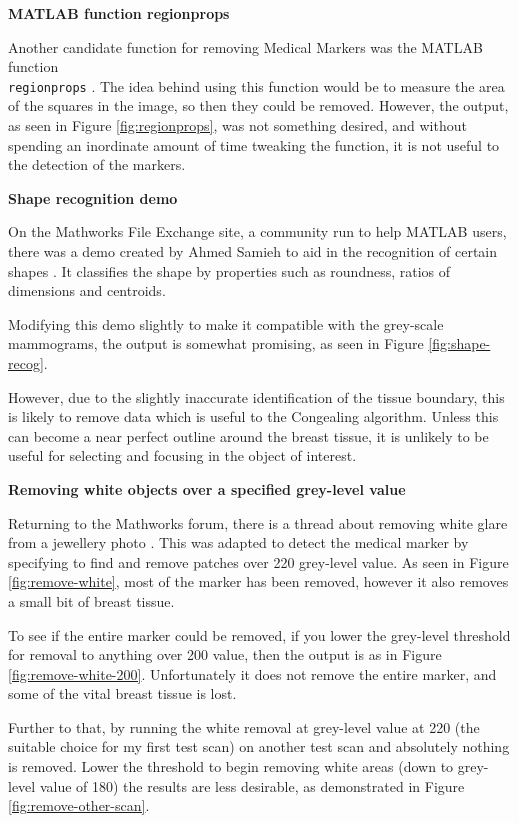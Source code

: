 \noindent \textbf{MATLAB function regionprops}

Another candidate function for removing Medical Markers was the MATLAB function \\ \texttt{regionprops} \cite{regionprops}. The idea behind using this function would be to measure the area of the squares in the image, so then they could be removed. However, the output, as seen in Figure \ref{fig:regionprops}, was not something desired, and without spending an inordinate amount of time tweaking the function, it is not useful to the detection of the markers.

\noindent \textbf{Shape recognition demo}

On the Mathworks File Exchange site, a community run to help MATLAB users, there was a demo created by Ahmed Samieh to aid in the recognition of certain shapes \cite{shape_recognition}. It classifies the shape by properties such as roundness, ratios of dimensions and centroids.

Modifying this demo slightly to make it compatible with the grey-scale mammograms, the output is somewhat promising, as seen in Figure \ref{fig:shape-recog}.

However, due to the slightly inaccurate identification of the tissue boundary, this is likely to remove data which is useful to the \Gls{Congealing} algorithm. Unless this can become a near perfect outline around the breast tissue, it is unlikely to be useful for selecting and focusing in the object of interest.

\noindent  \textbf{Removing white objects over a specified grey-level value}

Returning to the Mathworks forum, there is a thread about removing white glare from a jewellery photo \cite{remove_white}. This was adapted to detect the medical marker by specifying to find and remove patches over 220 grey-level value. As seen in Figure \ref{fig:remove-white}, most of the marker has been removed, however it also removes a small bit of breast tissue.

To see if the entire marker could be removed, if you lower the grey-level threshold for removal to anything over 200 value, then the output is as in Figure \ref{fig:remove-white-200}. Unfortunately it does not remove the entire marker, and some of the vital breast tissue is lost.

Further to that, by running the white removal at grey-level value at 220 (the suitable choice for my first test scan) on another test scan and absolutely nothing is removed. Lower the threshold to begin removing white areas (down to grey-level value of 180) the results are less desirable, as demonstrated in Figure \ref{fig:remove-other-scan}.


